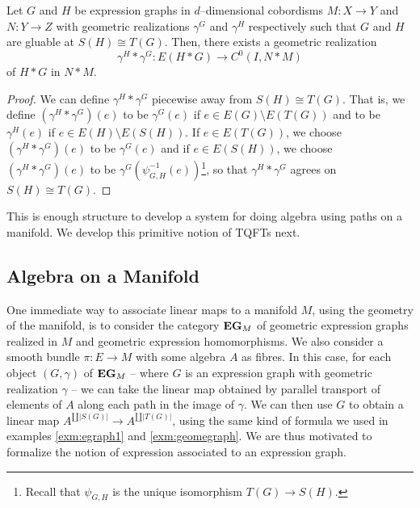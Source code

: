 \documentclass[./Thick_TQFTs_and_Quantum_Information.tex]{subfiles}
\begin{document}
\begin{lem}
Let $G$ and $H$ be expression graphs in $d$--dimensional cobordisms
$M : X \to Y$ and $N : Y \to Z$ with geometric realizations $\gamma^G$ and
$\gamma^H$ respectively such that $G$ and $H$ are gluable at $S(H) \cong T(G)$.
Then, there exists a geometric realization
\[
  \gamma^H * \gamma^G : E(H * G) \to C^0(I, N * M)
\]
of $H * G$ in $N * M$.
\end{lem}
\begin{proof}
We can define $\gamma^H * \gamma^G$ piecewise away from $S(H) \cong T(G)$. That
is, we define $(\gamma^H * \gamma^G)(e)$ to be
$\gamma^G(e)$ if $e \in E(G) \setminus E(T(G))$ and to be
$\gamma^H(e)$ if $e \in E(H) \setminus E(S(H))$.
If $e \in E(T(G))$, we choose $(\gamma^H * \gamma^G)(e)$ to be $\gamma^G(e)$ and
if $e \in E(S(H))$, we choose $(\gamma^H * \gamma^G)(e)$ to be
$\gamma^G(\psi_{G, H}^{-1}(e))$\footnote{Recall that $\psi_{G, H}$ is the unique
isomorphism $T(G) \to S(H)$.}, so that $\gamma^H * \gamma^G$ agrees on
$S(H) \cong T(G)$.
\end{proof}

This is enough structure to develop a system for doing algebra using paths on a
manifold. We develop this primitive notion of TQFTs next. 

\subsection{Algebra on a Manifold}

One immediate way to associate linear maps to a manifold $M$, using the geometry
of the manifold, is to consider the category $\textbf{EG}_{M}$ of geometric expression
graphs realized in $M$ and geometric expression homomorphisms. We also consider
a smooth bundle $\pi : E \to M$ with some algebra $A$ as fibres. In this case,
for each object $(G, \gamma)$ of $\textbf{EG}_M$ -- where $G$ is an expression graph
with geometric realization $\gamma$ -- we can take the linear map obtained by
parallel transport of elements of $A$ along each path in the image of $\gamma$.
We can then use $G$ to obtain a linear map
$A^{\amalg |S(G)|} \to A^{\amalg |T(G)|}$, using the same kind of formula we
used in examples \ref{exm:egraph1} and \ref{exm:geomegraph}. We are thus
motivated to formalize the notion of expression associated to an expression
graph.
\end{document}
